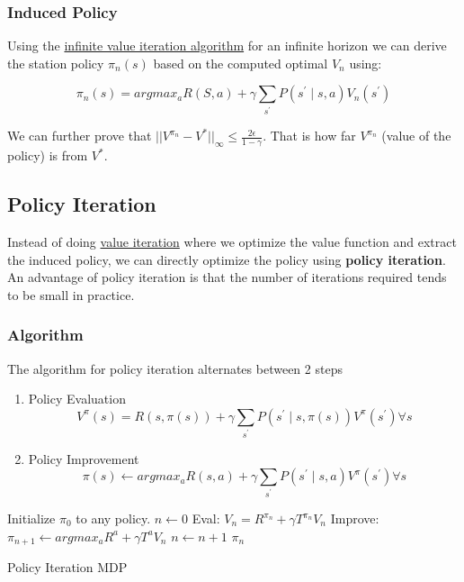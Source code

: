 \documentclass[12pt]{article}
\begin{document}
            \subsubsection{Induced Policy}
                Using the \hyperref[InfiniteValIterAlgo]{infinite value iteration algorithm} for an infinite horizon we
                can derive the station policy $\pi_n(s)$ based on the computed optimal $V_n$ using:

                $$ \pi_n(s) = argmax_a R(S,a) + \gamma \sum_{s^{\prime}} P(s^{\prime} \mid s, a) V_n(s^{\prime}) $$

                We can further prove that $||V^{\pi_n} - V^*||_{\infty} \leq \frac{2 \epsilon}{1-\gamma}$. That is how
                far $V^{\pi_n}$ (value of the policy) is from $V^*$. 

    \subsection{Policy Iteration}
        Instead of doing \hyperref[sec:ValueIteration]{value iteration} where we optimize the value function and extract
        the induced policy, we can directly optimize the policy using \textbf{policy iteration}. An advantage of policy
        iteration is that the number of iterations required tends to be small in practice.
        
        \subsubsection{Algorithm}
            The algorithm for policy iteration alternates between 2 steps
            \begin{enumerate}
                \item Policy Evaluation
                $$ V^{\pi}(s) = R(s, \pi(s)) + \gamma \sum_{s^{\prime}} P(s^{\prime} \mid s, \pi(s)) V^{\pi}(s^{\prime})
                \forall s $$
                \item Policy Improvement
                $$ \pi(s) \gets argmax_a R(s,a) + \gamma \sum_{s^{\prime}} P(s^{\prime} \mid s,a) V^{\pi}(s^{\prime})
                \forall s $$
            \end{enumerate}
            
            \begin{algorithm}[H] \label{PolicyIterationAlgo}
                \SetAlgoLined
                Initialize $\pi_0$ to any policy. \;
                $n \gets 0$ \;
                 {
                    Eval: $V_n = R^{\pi_n} + \gamma T^{\pi_n} V_n$ \;
                    Improve: $\pi_{n+1} \gets argmax_a R^a + \gamma T^a V_n$ \;
                    $n \gets n + 1$
                }
                \Return $\pi_n$
                \caption{Policy Iteration MDP}
            \end{algorithm}
\end{document}
